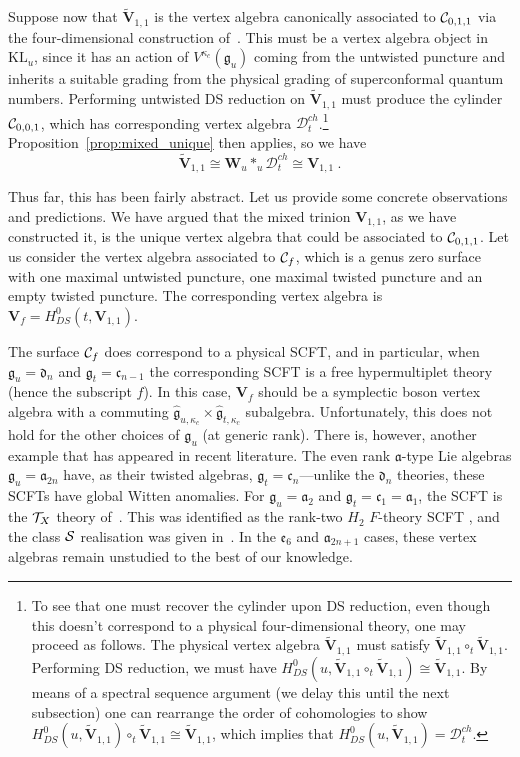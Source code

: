 \documentclass[a4paper]{article}
\def\CC{{\cal C}}
\def\SS{{\cal S}}
\def\TT{{\cal T}}
\def\af{\mathfrak{a}}
\def\df{\mathfrak{d}}
\def\ef{\mathfrak{e}}
\def\gf{\mathfrak{g}}
\def \KL{\mathrm{KL}}
\def\D{\mathcal{D}^{ch}}
\def\W{\mathbf{W}}
\def\V{\mathbf{V}}
\begin{document}
Suppose now that $\widetilde{\V}_{1,1}$ is the vertex algebra canonically associated to $\CC_{0,1,1}$ via the four-dimensional construction of~\cite{Beem:2013sza}. This must be a vertex algebra object in $\KL_u$, since it has an action of $V^{\kappa_c}(\gf_u)$ coming from the untwisted puncture and inherits a suitable grading from the physical grading of superconformal quantum numbers. Performing untwisted DS reduction on $\tilde{\V}_{1,1}$ must produce the cylinder $\CC_{0,0,1}$, which has corresponding vertex algebra $\D_t$.\footnote{To see that one must recover the cylinder upon DS reduction, even though this doesn't correspond to a physical four-dimensional theory, one may proceed as follows. The physical vertex algebra $\widetilde{\V}_{1,1}$ must satisfy $\widetilde{\V}_{1,1}\circ_t \widetilde{\V}_{1,1}$. Performing DS reduction, we must have $H^0_{DS}(u,\widetilde{\V}_{1,1}\circ_t\widetilde{\V}_{1,1})\cong \widetilde{\V}_{1,1}$. By means of a spectral sequence argument (we delay this until the next subsection) one can rearrange the order of cohomologies to show $H^0_{DS}(u,\widetilde{\V}_{1,1})\circ_t \widetilde{\V}_{1,1}\cong\widetilde{\V}_{1,1}$, which implies that $H^0_{DS}(u,\widetilde{\V}_{1,1})=\D_t$.}
%
Proposition~\ref{prop:mixed_unique} then applies, so we have
\begin{equation}
	\widetilde{\V}_{1,1}\cong \W_u\ast_u \D_t \cong \V_{1,1}~.
\end{equation}

Thus far, this has been fairly abstract. Let us provide some concrete observations and predictions. We have argued that the mixed trinion $\V_{1,1}$, as we have constructed it, is the unique vertex algebra that could be associated to $\CC_{0,1,1}$. Let us consider the vertex algebra associated to $\CC_{f}$, which is a genus zero surface with one maximal untwisted puncture, one maximal twisted puncture and an empty twisted puncture. The corresponding vertex algebra is $\V_{f}=H^0_{DS}(t,\V_{1,1})$.

The surface $\CC_f$ does correspond to a physical SCFT, and in particular, when $\gf_u=\df_n$ and $\gf_t=\mathfrak{c}_{n-1}$ the corresponding SCFT is a free hypermultiplet theory (hence the subscript $f$). In this case, $\V_f$ should be a symplectic boson vertex algebra with a commuting $\hat{\gf}_{u,\kappa_c}\times\hat{\gf}_{t,\kappa_c}$ subalgebra. Unfortunately, this does not hold for the other choices of $\gf_u$ (at generic rank). There is, however, another example that has appeared in recent literature. The even rank $\af$-type Lie algebras $\gf_u=\af_{2n}$ have, as their twisted algebras, $\gf_t=\mathfrak{c}_{n}$---unlike the $\df_n$ theories, these SCFTs have global Witten anomalies. For $\gf_u=\af_2$ and $\gf_t=\mathfrak{c}_1=\af_1$, the SCFT is the $\TT_X$ theory of~\cite{Buican:2017fiq}. This was identified as the rank-two $H_2$ $F$-theory SCFT \cite{Beem:2019snk}, and the class $\SS$ realisation was given in~\cite{Beem:2020pry}. In the $\ef_6$ and $\af_{2n+1}$ cases, these vertex algebras remain unstudied to the best of our knowledge.
\end{document}
